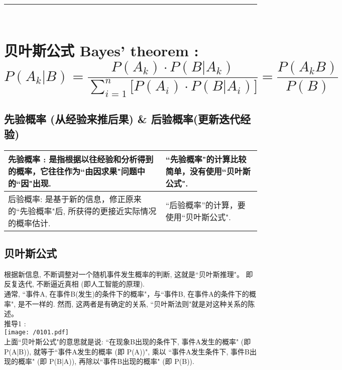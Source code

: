 \documentclass[UTF8]{ctexart}
\begin{document}
~\\
\hrule
~\\



\section{贝叶斯公式 Bayes' theorem : $ \boxed{
	P\left( A_k|B \right) =\dfrac{P\left( A_k \right) \cdot P\left( B|A_k \right)}{\sum_{i=1}^n{\text{[}}P\left( A_i \right) \cdot P\left( B|A_i \right) \text{]}}=\dfrac{P\left( A_kB \right)}{P\left( B \right)}
}	$}

\subsection{先验概率 (从经验来推后果) \& 后验概率(更新迭代经验)}

\begin{tabular}{|p{}|p{}|}
	\hline
先验概率 :	是指根据以往经验和分析得到的概率，它往往作为``由因求果"问题中的``因"出现.  
&   
``先验概率"的计算比较简单，没有使用``贝叶斯公式". \\
	\hline
后验概率: 是基于新的信息，修正原来的``先验概率"后, 所获得的更接近实际情况的概率估计.	
& ``后验概率''的计算，要使用``贝叶斯公式".
	  \\
	\hline
\end{tabular} 




\subsection{贝叶斯公式}

根据新信息, 不断调整对一个随机事件发生概率的判断, 这就是``贝叶斯推理"。 即反复迭代, 不断逼近真相 (即人工智能的原理). \\

通常, ``事件A, 在事件B(发生)的条件下的概率"，与``事件B, 在事件A的条件下的概率", 是不一样的. 然而, 这两者是有确定的关系, ``贝叶斯法则"就是对这种关系的陈述。 \\

推导1 : \\
\texttt{[image: /0101.pdf]} \\

上面``贝叶斯公式"的意思就是说: ``在现象B出现的条件下, 事件A发生的概率" (即 P(A|B)), 就等于``事件A发生的概率 (即 P(A))", 乘以 ``事件A发生条件下, 事件B出现的概率" (即 P(B|A)), 再除以``事件B出现的概率" (即 P(B)). \\
\end{document}
